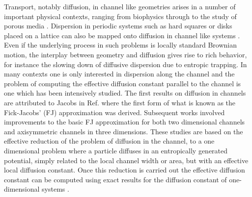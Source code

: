 \documentclass[pre,showpacs,preprintnumbers,amsmath,amssymb,superscriptaddress]{revtex4-1}
\begin{document}
Transport, notably diffusion, in channel like geometries arises in a number of important physical contexts, ranging from biophysics through to the study of porous media \cite{burada2009diffusion,malgaretti2013entropic,bressloff2013stochastic,holcman2013control}. Dispersion in periodic systems such as hard squares or disks placed on a lattice can also be mapped onto diffusion in channel like systems \cite{dag2012b}.
Even if the underlying process in such problems is locally standard Brownian motion, the interplay between geometry and diffusion gives rise to rich behavior, for instance the slowing down of diffusive dispersion due to entropic trapping. In many contexts one is only interested in dispersion along the channel and the problem of computing the effective diffusion constant parallel to the channel is one which has been intensively studied. The
first results on diffusion in channels are attributed to Jacobs in Ref. \cite{jac1967} where the first form of what is known as the Fick-Jacobs' (FJ) approximation was derived. Subsequent works \cite{zwa1991,reg2001,kal2005,kal2006,mar2011,bra2009,ber2011a,dag2012} involved improvements to the basic FJ approximation for both two dimensional channels and axisymmetric channels in three dimensions. These studies are based on the effective reduction of the problem of diffusion in the channel, to a one dimensional problem where a particle diffuses in an entropically generated potential, simply related to the local channel width or area, but with an effective local diffusion constant. Once this reduction is carried out the effective diffusion constant can be computed using exact results for the diffusion constant
of one-dimensional systems \cite{lif1961,rei2001,costantini1999}. 
\end{document}
